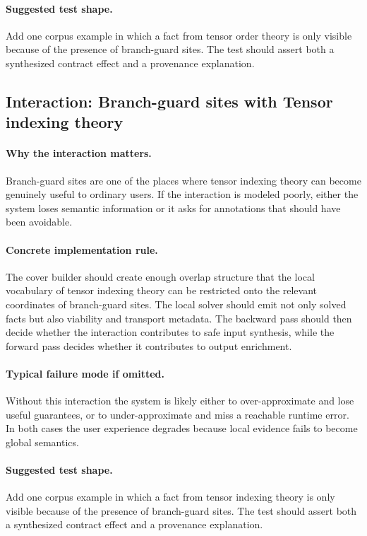 \documentclass[11pt]{report}
\theoremstyle{definition}
\theoremstyle{plain}
\begin{document}
\paragraph{Suggested test shape.}
Add one corpus example in which a fact from tensor order theory is only
visible because of the presence of branch-guard sites. The test should
assert both a synthesized contract effect and a provenance explanation.

\subsection{Interaction: Branch-guard sites with Tensor indexing theory}

\paragraph{Why the interaction matters.}
Branch-guard sites are one of the places where tensor indexing theory can become
genuinely useful to ordinary users. If the interaction is modeled poorly,
either the system loses semantic information or it asks for annotations that
should have been avoidable.

\paragraph{Concrete implementation rule.}
The cover builder should create enough overlap structure that the local
vocabulary of tensor indexing theory can be restricted onto the relevant
coordinates of branch-guard sites. The local solver should emit not only
solved facts but also viability and transport metadata. The backward pass
should then decide whether the interaction contributes to safe input
synthesis, while the forward pass decides whether it contributes to output
enrichment.

\paragraph{Typical failure mode if omitted.}
Without this interaction the system is likely either to over-approximate and
lose useful guarantees, or to under-approximate and miss a reachable runtime
error. In both cases the user experience degrades because local evidence
fails to become global semantics.

\paragraph{Suggested test shape.}
Add one corpus example in which a fact from tensor indexing theory is only
visible because of the presence of branch-guard sites. The test should
assert both a synthesized contract effect and a provenance explanation.
\end{document}
